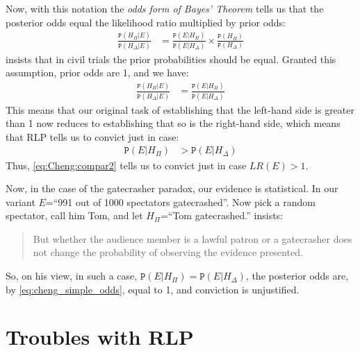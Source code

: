 \documentclass{ifcolog}
\newcommand{\pr}[1]{\mbox{$\mathtt{P}(#1)$}}
\begin{document}
 Now,  with this notation the \emph{odds form of Bayes' Theorem} tells us that the posterior odds equal the likelihood ratio multiplied by prior odds:
\begin{align*}
\frac{\pr{H_\Pi \vert E}}{\pr{H_\Delta \vert E}} & = 
\frac{\pr{E\vert H_\Pi}}{\pr{E\vert H_\Delta}} 
\times \frac{\pr{H_\Pi}}{\pr{H_\Delta}}
 \end{align*}
\noindent \citet[1267]{cheng2012reconceptualizing} insists that in civil trials the prior probabilities should be equal. Granted this assumption, prior odds are 1, and we have:
\begin{align}\label{eq:cheng_simple_odds}
\frac{\pr{H_\Pi \vert E}}{\pr{H_\Delta \vert E}} & = 
\frac{\pr{E\vert H_\Pi}}{\pr{E\vert H_\Delta}} 
 \end{align}
This means that our original task of establishing that the left-hand side is greater than 1 now reduces to establishing that so is the right-hand side, which means that RLP  tells us to convict just in case:
\begin{align}\label{eq:Cheng:compar2}
\pr{E\vert H_\Pi} &> \pr{E\vert H_\Delta}
\end{align}
Thus, \eqref{eq:Cheng:compar2} tells us to convict just in case $LR(E)>1$.

Now, in the case of the gatecrasher paradox, our evidence is statistical. In our variant $E$=``991 out of 1000 spectators gatecrashed''. Now pick a random spectator, call him Tom, and let $H_\Pi$=``Tom gatecrashed.'' \citep[1270]{cheng2012reconceptualizing} insists:
\begin{quote}
But whether the audience member is a lawful patron or a gatecrasher does not change the probability of observing the evidence presented.
\end{quote}
\noindent So, on his view, in such a case, $\pr{E\vert H_\Pi}=\pr{E\vert H_\Delta}$, the posterior odds are, by \eqref{eq:cheng_simple_odds}, equal to 1, and conviction is unjustified.


 \section{Troubles with RLP}\label{sec:troubles_with_RLP}
\end{document}

